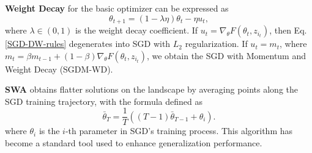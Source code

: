 
\textbf{Weight Decay} for the basic optimizer can be expressed as
\begin{equation}\label{SGD-DW-rules}
   \theta_{t+1} = (1-\lambda\eta)\theta_{t} - \eta u_t,
\end{equation} 
where $\lambda \in (0,1)$ is the weight decay coefficient. If $u_t = \nabla_\theta F(\theta_{t},z_{i_t})$, then Eq. \ref{SGD-DW-rules} degenerates into SGD with $L_2$ regularization. If $u_t =m_t$, where $m_t=\beta m_{t-1}+(1-\beta)\nabla_\theta F(\theta_{t},z_{i_t})$, we obtain the SGD with Momentum and Weight Decay (SGDM-WD).

\textbf{SWA} obtains flatter solutions on the landscape by averaging points along the SGD training trajectory, with the formula defined as  
\begin{equation}\label{SWA*-rules}
    \bar{\theta}_{T}=\frac{1}{T} ((T-1)\bar{\theta}_{T-1} +\theta_{i}).
\end{equation}
where $\theta_i$ is the $i$-th parameter in SGD's training process. This algorithm \cite{izmailov2018averaging} has become a standard tool used to enhance generalization performance.





